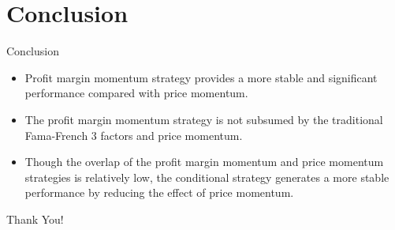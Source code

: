 \documentclass{beamer}
\begin{document}
\section{Conclusion}
\begin{frame}{Conclusion}
    \begin{itemize}
        \item Profit margin momentum strategy provides a more stable and significant performance compared with price momentum.
        \item The profit margin momentum strategy is not subsumed by the traditional Fama-French 3 factors and price momentum.
        \item Though the overlap of the profit margin momentum and price momentum strategies is relatively low, the conditional strategy generates a more stable performance
        by reducing the effect of price momentum.
    \end{itemize}
\end{frame}

\begin{frame}
    \centering
    {\Huge Thank You!}
\end{frame}
    
\end{document}
